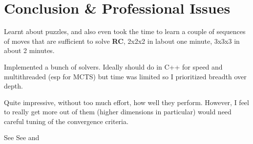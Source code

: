 
\chapter{Conclusion \& Professional Issues} %

\label{Conclusion} %



Learnt about puzzles, and also even took the time to learn a couple of sequences of moves that are sufficient to solve \textbf{RC}, 2x2x2 in labout one minute, 3x3x3 in about 2 minutes.

Implemented a bunch of solvers. Ideally should do in C++ for speed and multithreaded (esp for MCTS) but time was limited so I prioritized breadth over depth.

Quite impressive, without too much effort, how well they perform. However, I feel to really get more out of them (higher dimensions in particular) would need careful tuning of the convergence criteria.

See \cite{ManyWorlds}
See \cite{https://doi.org/10.1111/1758-5899.12718} and \cite{Bostrom2014}
